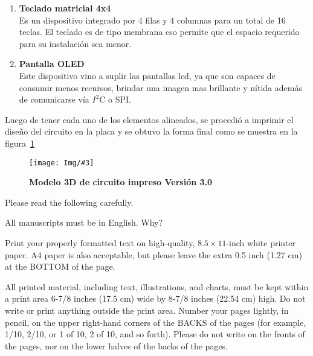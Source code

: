\documentclass[times, 10pt,twocolumn]{article}
\newcommand{\Img}[5]{
   \begin{figure}[H]
   	   \centering
       \texttt{[image: Img/\#3]}
       \caption{ \centering \textbf{\small #4}}
       \label{#5}
       \end{figure}
   }
\begin{document}
\begin{enumerate}[label=\emph{\Alph*.}]
  \item \textbf{Teclado matricial 4x4}\\ Es un dispositivo integrado por 4 filas y 4 columnas para un total de 16 teclas. El teclado es de tipo membrana eso permite que el espacio requerido para su instalación sea menor.
  \item \textbf{Pantalla OLED}\\ Este dispositivo vino a suplir las pantallas lcd, ya que son capaces de consumir menos recursos, brindar una imagen mas brillante y nítida además 
    de comunicarse vía $I^{2}$C o SPI.
\end{enumerate}


Luego de tener cada uno de los elementos alineados, se procedió a imprimir el diseño del circuito en la placa y se obtuvo la forma final como se muestra en la figura~\ref{fig:11}
\Img{7.9cm}{7.0cm}{tercera_version_3d}{Modelo 3D de circuito impreso Versión 3.0}{fig:11}



Please read the following carefully.


All manuscripts must be in English. Why?


Print your properly formatted text on high-quality, $8.5 \times 11$-inch 
white printer paper. A4 paper is also acceptable, but please leave the 
extra 0.5 inch (1.27 cm) at the BOTTOM of the page.


All printed material, including text, illustrations, and charts, must be 
kept within a print area 6-7/8 inches (17.5 cm) wide by 8-7/8 inches 
(22.54 cm) high. Do not write or print anything outside the print area. 
Number your pages lightly, in pencil, on the upper right-hand corners of 
the BACKS of the pages (for example, 1/10, 2/10, or 1 of 10, 2 of 10, and 
so forth). Please do not write on the fronts of the pages, nor on the 
lower halves of the backs of the pages.
\end{document}
